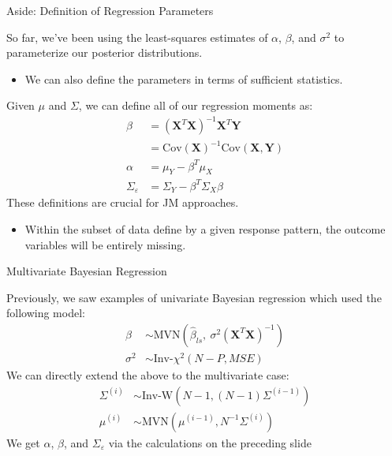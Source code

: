 \documentclass{beamer}\usepackage[]{graphicx}\usepackage[]{color}
\begin{document}
\begin{frame}{Aside: Definition of Regression Parameters}
  
  So far, we've been using the least-squares estimates of $\alpha$, $\beta$, and 
  $\sigma^2$ to parameterize our posterior distributions.
  \vc
  \begin{itemize}
  \item We can also define the parameters in terms of sufficient statistics.
  \end{itemize}
  \vb
  Given $\mu$ and $\Sigma$, we can define all of our regression moments as:
  \begin{align*}
    \beta &= (\mathbf{X}^T \mathbf{X})^{-1} \mathbf{X}^T \mathbf{Y}\\
    &= \text{Cov}(\mathbf{X})^{-1} \text{Cov}(\mathbf{X}, \mathbf{Y})\\
    \alpha &= \mu_Y - \beta^T \mu_X\\
    \Sigma_{\varepsilon} &= \Sigma_Y - \beta^T \Sigma_X \beta
  \end{align*}
  These definitions are crucial for JM approaches.
  \begin{itemize}
  \item Within the subset of data define by a given response pattern, the 
    outcome variables will be entirely missing.
  \end{itemize}
  
\end{frame}


\begin{frame}{Multivariate Bayesian Regression}
  
  Previously, we saw examples of univariate Bayesian regression which used the 
  following model:
  \begin{align*}
    \beta &\sim \text{MVN} \left( \hat{\beta}_{ls}, ~ 
    \sigma^2 (\mathbf{X}^T \mathbf{X})^{-1} \right)\\
    \sigma^2 &\sim \text{Inv-}\chi^2 \left(N - P, MSE \right)
  \end{align*}
  We can directly extend the above to the multivariate case:
  \begin{align*}
    \Sigma^{(i)} &\sim \text{Inv-W} \left(N - 1, (N - 1) \Sigma^{(i - 1)} \right)\\
    \mu^{(i)} &\sim \text{MVN} \left(\mu^{(i - 1)}, N^{-1}\Sigma^{(i)} \right)
  \end{align*}
  We get $\alpha$, $\beta$, and $\Sigma_{\varepsilon}$ via the calculations on the 
  preceding slide
\end{frame}
\end{document}
